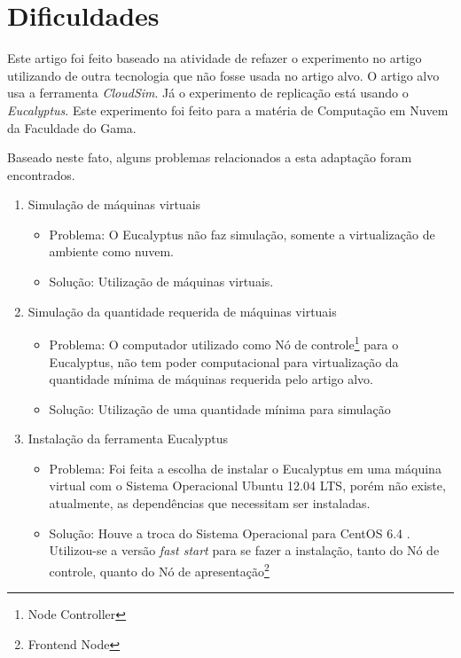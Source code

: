\section{Dificuldades}

Este artigo foi feito baseado na atividade de refazer o experimento no artigo \cite{elaine_et_al:14} utilizando de outra tecnologia que não fosse usada no artigo alvo. O artigo alvo usa a ferramenta \textit{CloudSim}. Já o experimento de replicação está usando o \textit{Eucalyptus}. Este experimento foi feito para a matéria de Computação em Nuvem da Faculdade do Gama.

Baseado neste fato, alguns problemas relacionados a esta adaptação foram encontrados.

\begin{enumerate}

  \item Simulação de máquinas virtuais
  \begin{itemize}
    \item Problema: O Eucalyptus não faz simulação, somente a virtualização de ambiente como nuvem.
    \item Solução: Utilização de máquinas virtuais.
  \end{itemize}

  \item Simulação da quantidade requerida de máquinas virtuais
  \begin{itemize}
    \item Problema: O computador utilizado como Nó de controle\footnote{Node Controller} para o Eucalyptus, não tem poder computacional para virtualização da quantidade mínima de máquinas requerida pelo artigo alvo.
    \item Solução: Utilização de uma quantidade mínima para simulação
  \end{itemize}

  \item Instalação da ferramenta Eucalyptus
  \begin{itemize}
    \item Problema: Foi feita a escolha de instalar o Eucalyptus em uma máquina virtual com o Sistema Operacional Ubuntu 12.04 LTS, porém não existe, atualmente, as dependências que necessitam ser instaladas.
    \item Solução: Houve a troca do Sistema Operacional para CentOS 6.4 . Utilizou-se a versão \textit{fast start} para se fazer a instalação, tanto do Nó de controle, quanto do Nó de apresentação\footnote{Frontend Node}
  \end{itemize}

\end{enumerate}


\begin{comment}

  \item Instalação da ferramenta Eucalyptus
  \begin{itemize}
    \item Problema:
    \item Solução:
  \end{itemize}


\end{comment}
